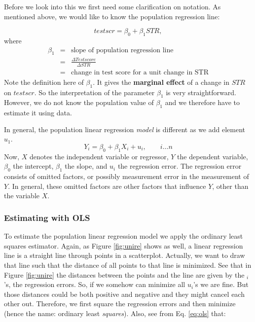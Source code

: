 \documentclass[
]{book}
\begin{document}
Before we look into this we first need some clarification on notation. As mentioned above, we would like to know the population regression line:

\begin{equation}
testscr = \beta_0 + \beta_1 STR,
\end{equation}
where
\begin{eqnarray}
    \beta_1& =& \text{slope of population regression line} \\
    &=&   \frac{\Delta Testscore}{\Delta STR}\\
    &=& \text{change in test score for a unit change in STR}
\end{eqnarray}
Note the definition here of \(\beta_1\). It gives the \textbf{marginal effect} of a change in \(STR\) on \(testscr\). So the interpretation of the parameter \(\beta_1\) is very straightforward. However, we do not know the population value of \(\beta_1\) and we therefore have to estimate it using data.

In general, the population linear regression \emph{model} is different as we add element \(u_1\).
\begin{equation}
    Y_i = \beta_0 + \beta_1 X_i + u_i, \qquad i\ldots n
    \label{eq:ols}
\end{equation}
Now, \(X\) denotes the independent variable or regressor, \(Y\) the dependent variable, \(\beta_0\) the intercept, \(\beta_1\) the slope, and \(u_i\) the regression error. The regression error consists of omitted factors, or possibly measurement error in the measurement of \(Y\). In general, these omitted factors are other factors that influence \(Y\), other than the variable \(X\).

\hypertarget{estimating-with-ols}{%
\subsubsection{Estimating with OLS}\label{estimating-with-ols}}

To estimate the population linear regression model we apply the ordinary least squares estimator. Again, as Figure \ref{fig:unire} shows as well, a linear regression line is a straight line through points in a scatterplot. Actually, we want to draw that line such that the distance of all points to that line is minimized. See that in Figure \ref{fig:unire} the distances between the points and the line are given by the \(_i\)'s, the regression errors. So, if we somehow can minimize all \(u_i\)'s we are fine. But those distances could be both positive and negative and they might cancel each other out. Therefore, we first square the regression errors and then minimize (hence the name: ordinary least \emph{squares}). Also, see from Eq. \eqref{eq:ols} that:
\end{document}
